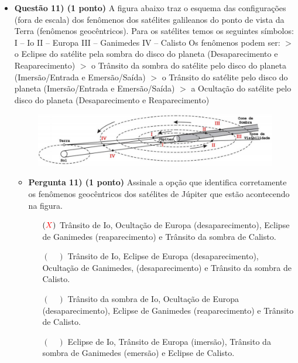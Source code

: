 \documentclass[a4paper, 12pt]{article}
\newcommand{\red}[1]{\textcolor{red}{#1}}
\begin{document}
\begin{flushleft}
\begin{itemize}
        \item \textbf{Questão 11) (1 ponto)} A figura abaixo traz o esquema das configurações (fora de escala) dos fenômenos dos satélites galileanos do ponto de vista da Terra (fenômenos geocêntricos). Para os satélites temos os seguintes símbolos: \linebreak\linebreak I – Io \linebreak II – Europa \linebreak III – Ganimedes \linebreak IV – Calisto \linebreak\linebreak Os fenômenos podem ser: \linebreak $>$ o Eclipse do satélite pela sombra do disco do planeta (Desaparecimento e Reaparecimento) \linebreak $>$ o Trânsito da sombra do satélite pelo disco do planeta (Imersão/Entrada e Emersão/Saída) \linebreak $>$ o Trânsito do satélite pelo disco do planeta (Imersão/Entrada e Emersão/Saída) \linebreak $>$ a Ocultação do satélite pelo disco do planeta (Desaparecimento e Reaparecimento)
            \begin{figure}[H]
                \centering
                \includegraphics[scale=0.4]{img/11.png}
            \end{figure}
            \begin{itemize}
                \item \textbf{Pergunta 11) (1 ponto)} Assinale a opção que identifica corretamente os fenômenos geocêntricos dos satélites de Júpiter que estão acontecendo na figura.
                    \begin{itemize}
                        \item[$(\red{X})$] Trânsito de Io, Ocultação de Europa (desaparecimento), Eclipse de Ganimedes (reaparecimento) e Trânsito da sombra de Calisto.
                        \item[$(\quad)$] Trânsito de Io, Eclipse de Europa (desaparecimento), Ocultação de Ganimedes, (desaparecimento) e Trânsito da sombra de Calisto.
                        \item[$(\quad)$] Trânsito da sombra de Io, Ocultação de Europa (desaparecimento), Eclipse de Ganimedes (reaparecimento) e Trânsito de Calisto.
                        \item[$(\quad)$] Eclipse de Io, Trânsito de Europa (imersão), Trânsito da sombra de Ganimedes (emersão) e Eclipse de Calisto.
                    \end{itemize}
            \end{itemize}


\end{itemize}
\end{flushleft}
\end{document}
